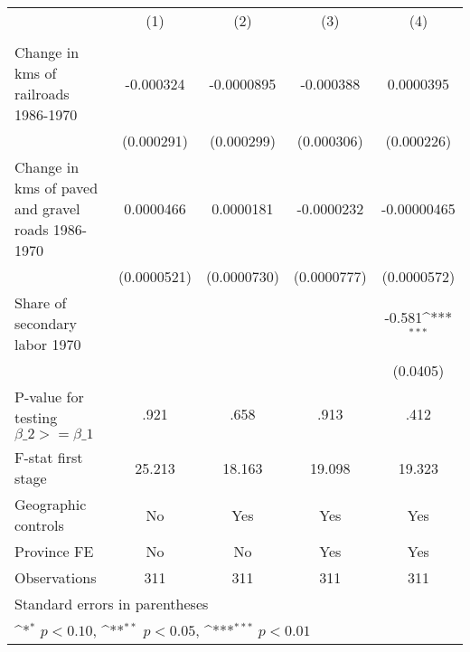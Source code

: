 {
\def\sym#1{\ifmmode^{#1}\else\(^{#1}\)\fi}
\begin{tabular}{l*{4}{c}}
\hline\hline
                &\multicolumn{1}{c}{(1)}&\multicolumn{1}{c}{(2)}&\multicolumn{1}{c}{(3)}&\multicolumn{1}{c}{(4)}\\
                &\multicolumn{1}{c}{}&\multicolumn{1}{c}{}&\multicolumn{1}{c}{}&\multicolumn{1}{c}{}\\
\hline
Change in kms of railroads 1986-1970&-0.000324         &-0.0000895         &-0.000388         &0.0000395         \\
                &(0.000291)         &(0.000299)         &(0.000306)         &(0.000226)         \\
[1em]
Change in kms of paved and gravel roads 1986-1970&0.0000466         &0.0000181         &-0.0000232         &-0.00000465         \\
                &(0.0000521)         &(0.0000730)         &(0.0000777)         &(0.0000572)         \\
[1em]
Share of secondary labor 1970&                  &                  &                  &   -0.581\sym{***}\\
                &                  &                  &                  & (0.0405)         \\
\hline
P-value for testing $\beta\_{2} >= \beta\_{1}$&     .921         &     .658         &     .913         &     .412         \\
F-stat first stage&   25.213         &   18.163         &   19.098         &   19.323         \\
Geographic controls&       No         &      Yes         &      Yes         &      Yes         \\
Province FE     &       No         &       No         &      Yes         &      Yes         \\
Observations    &      311         &      311         &      311         &      311         \\
\hline\hline
\multicolumn{5}{l}{\footnotesize Standard errors in parentheses}\\
\multicolumn{5}{l}{\footnotesize \sym{*} \(p<0.10\), \sym{**} \(p<0.05\), \sym{***} \(p<0.01\)}\\
\end{tabular}
}
